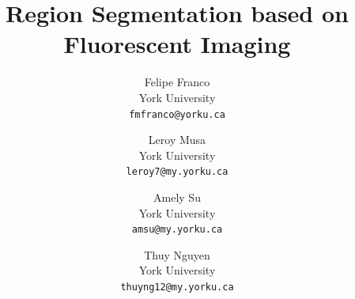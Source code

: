 \documentclass[10pt,twocolumn,letterpaper]{article}
\title{Region Segmentation based on Fluorescent Imaging}
\author{%
Felipe Franco\\
York University\\
{\tt\small fmfranco@yorku.ca}
\and
Leroy Musa\\
York University\\
{\tt\small leroy7@my.yorku.ca}
\and
Amely Su\\
York University\\
{\tt\small amsu@my.yorku.ca}
\and
Thuy Nguyen\\
York University\\
{\tt\small thuyng12@my.yorku.ca}
}
\begin{document}
\maketitle
    



{
    \small
    
    
}

% 
\end{document}
